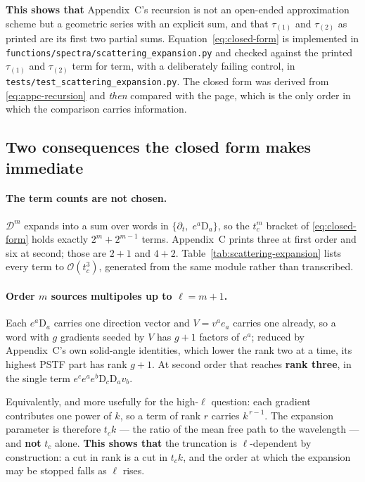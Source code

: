 \textbf{This shows that} Appendix~C's recursion is not an open-ended
approximation scheme but a geometric series with an explicit sum, and that
$\tau_{(1)}$ and $\tau_{(2)}$ as printed are its first two partial sums.
Equation~\eqref{eq:closed-form} is implemented in
\texttt{functions/spectra/scattering\_expansion.py} and checked against the
printed $\tau_{(1)}$ and $\tau_{(2)}$ term for term, with a deliberately
failing control, in \texttt{tests/test\_scattering\_expansion.py}. The closed
form was derived from \eqref{eq:appc-recursion} and \emph{then} compared with
the page, which is the only order in which the comparison carries information.

\subsection{Two consequences the closed form makes immediate}

\paragraph{The term counts are not chosen.} $\mathcal D^m$ expands into a sum
over words in $\{\partial_t,\;e^a\mathrm D_a\}$, so the $t_c^m$ bracket of
\eqref{eq:closed-form} holds exactly $2^m+2^{m-1}$ terms. Appendix~C prints
three at first order and six at second; those are $2+1$ and $4+2$.
Table~\ref{tab:scattering-expansion} lists every term to
$\mathcal O(t_c^3)$, generated from the same module rather than transcribed.

\paragraph{Order $m$ sources multipoles up to $\ell=m+1$.} Each
$e^a\mathrm D_a$ carries one direction vector and $V=v^ae_a$ carries one
already, so a word with $g$ gradients seeded by $V$ has $g+1$ factors of
$e^a$; reduced by Appendix~C's own solid-angle identities, which lower the rank
two at a time, its highest PSTF part has rank $g+1$. At second order that
reaches \textbf{rank three}, in the single term
$e^ce^ae^b\mathrm D_c\mathrm D_av_b$.

Equivalently, and more usefully for the high-$\ell$ question: each gradient
contributes one power of $k$, so a term of rank $r$ carries $k^{\,r-1}$. The
expansion parameter is therefore $t_ck$ --- the ratio of the mean free path to
the wavelength --- and \textbf{not} $t_c$ alone. \textbf{This shows that} the
truncation is $\ell$-dependent by construction: a cut in rank is a cut in
$t_ck$, and the order at which the expansion may be stopped falls as $\ell$
rises.

